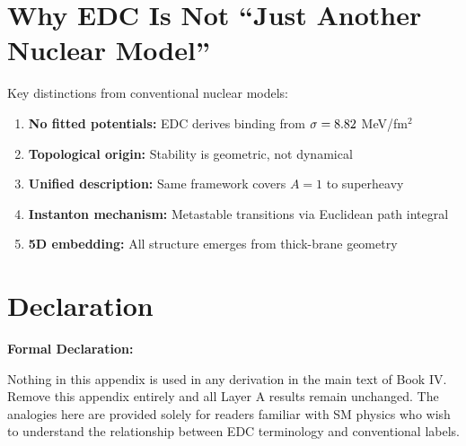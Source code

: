 \section{Why EDC Is Not ``Just Another Nuclear Model''}
\label{sec:x:not_nuclear}

Key distinctions from conventional nuclear models:

\begin{enumerate}
    \item \textbf{No fitted potentials:} EDC derives binding from $\sigma = 8.82$ MeV/fm$^2$
    \item \textbf{Topological origin:} Stability is geometric, not dynamical
    \item \textbf{Unified description:} Same framework covers $A = 1$ to superheavy
    \item \textbf{Instanton mechanism:} Metastable transitions via Euclidean path integral
    \item \textbf{5D embedding:} All structure emerges from thick-brane geometry
\end{enumerate}

\section{Declaration}
\label{sec:x:declaration}

\begin{tcolorbox}[colback=gray!10,colframe=gray!50!black]
\textbf{Formal Declaration:}

Nothing in this appendix is used in any derivation in the main text of Book IV.
Remove this appendix entirely and all Layer A results remain unchanged. The
analogies here are provided solely for readers familiar with SM physics who wish
to understand the relationship between EDC terminology and conventional labels.
\end{tcolorbox}

